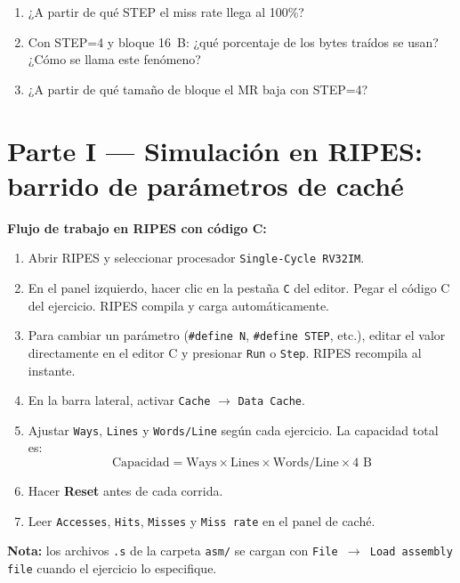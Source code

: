\documentclass[12pt, a4paper]{article}
\newcommand{\ripesbtn}[1]{\texttt{#1}}
\begin{document}
\begin{checkpoint}
    \begin{enumerate}
        \item ¿A partir de qué STEP el miss rate llega al 100\%?
        \item Con STEP=4 y bloque 16~B: ¿qué porcentaje de los bytes traídos se usan?
              ¿Cómo se llama este fenómeno?
        \item ¿A partir de qué tamaño de bloque el MR baja con STEP=4?
    \end{enumerate}
\end{checkpoint}

\newpage

\section{Parte I — Simulación en RIPES: barrido de parámetros de caché}

\begin{ripes}
    \textbf{Flujo de trabajo en RIPES con código C:}
    \begin{enumerate}
        \item Abrir RIPES y seleccionar procesador \ripesbtn{Single-Cycle RV32IM}.
        \item En el panel izquierdo, hacer clic en la pestaña \ripesbtn{C} del editor.
              Pegar el código C del ejercicio. RIPES compila y carga automáticamente.
        \item Para cambiar un parámetro (\texttt{\#define N}, \texttt{\#define STEP}, etc.),
              editar el valor directamente en el editor C y presionar \ripesbtn{Run} o
              \ripesbtn{Step}. RIPES recompila al instante.
        \item En la barra lateral, activar \ripesbtn{Cache} $\to$ \ripesbtn{Data Cache}.
        \item Ajustar \ripesbtn{Ways}, \ripesbtn{Lines} y \ripesbtn{Words/Line} según
              cada ejercicio. La capacidad total es:
              \[ \text{Capacidad} = \text{Ways} \times \text{Lines} \times \text{Words/Line} \times 4\text{ B} \]
        \item Hacer \textbf{Reset} antes de cada corrida.
        \item Leer \ripesbtn{Accesses}, \ripesbtn{Hits}, \ripesbtn{Misses} y
              \ripesbtn{Miss rate} en el panel de caché.
    \end{enumerate}
    \textbf{Nota:} los archivos \texttt{.s} de la carpeta \texttt{asm/} se cargan con
    \ripesbtn{File $\to$ Load assembly file} cuando el ejercicio lo especifique.
\end{ripes}
\end{document}
